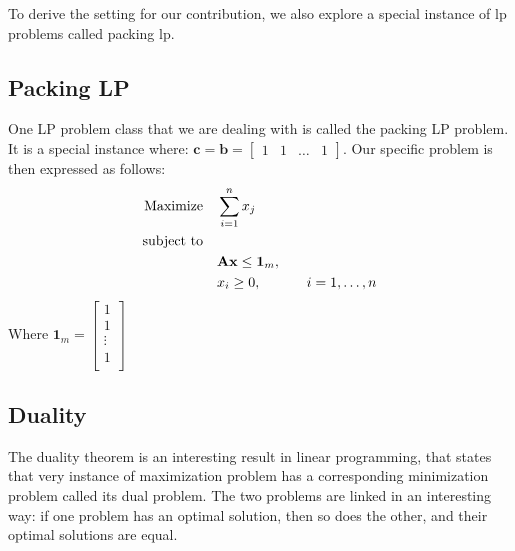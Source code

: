 To derive the setting for our contribution,
we also explore a special instance of \gls{lp} problems called packing \gls{lp}.
\subsection{Packing LP}
One LP problem class that we are dealing with is called the packing LP problem. It is a special instance where:
\( \mathbf{c}  = \mathbf{b} =  \begin{bmatrix}
    1 & 1 & \dots & 1
\end{bmatrix} \).
Our specific problem is then expressed as follows:
\begin{align}
    \text{Maximize} \quad   & \sum_{i=1}^{n} x_j \notag                                                             \\
    \text{subject to} \quad & \notag                                                                                \\
                            & \mathbf{A} \mathbf{x} \leq \mathbf{1}_m, \quad                                        \\
                            & x_i \geq 0, \quad                              & i = 1, \ldots, n \label{PLP_Problem}
\end{align}
Where $\mathbf{1}_m = \begin{bmatrix}
        1      \\
        1      \\
        \vdots \\
        1      \\
    \end{bmatrix}$


\subsection{Duality}\label{duality}

The duality theorem is an interesting result in linear programming, that
states that very instance of maximization problem has a corresponding
minimization problem called its dual problem.
The two problems are linked in an interesting way:
if one problem has an optimal solution, then so does the other,
and their optimal solutions are equal.

